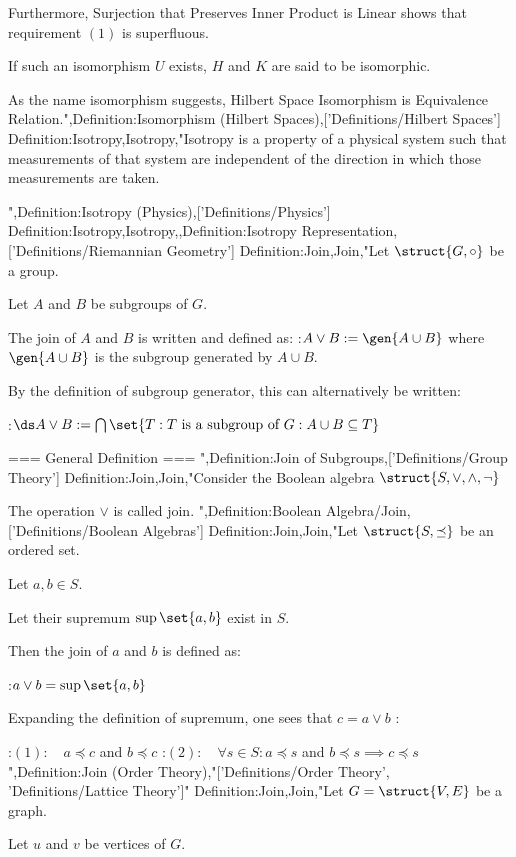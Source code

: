 Furthermore, Surjection that Preserves Inner Product is Linear shows that requirement $(1)$ is superfluous.


If such an isomorphism $U$ exists, $H$ and $K$ are said to be isomorphic.


As the name isomorphism suggests, Hilbert Space Isomorphism is Equivalence Relation.",Definition:Isomorphism (Hilbert Spaces),['Definitions/Hilbert Spaces']
Definition:Isotropy,Isotropy,"Isotropy is a property of a physical system such that measurements of that system are independent of the direction in which those measurements are taken.

",Definition:Isotropy (Physics),['Definitions/Physics']
Definition:Isotropy,Isotropy,,Definition:Isotropy Representation,['Definitions/Riemannian Geometry']
Definition:Join,Join,"Let $\struct {G, \circ}$ be a group.

Let $A$ and $B$ be subgroups of $G$.


The join of $A$ and $B$ is written and defined as:
:$A \vee B := \gen {A \cup B}$
where $\gen {A \cup B}$ is the subgroup generated by $A \cup B$.


By the definition of subgroup generator, this can alternatively be written:

:$\ds A \vee B := \bigcap \set {T: T \text { is a subgroup of } G: A \cup B \subseteq T}$


=== General Definition ===
",Definition:Join of Subgroups,['Definitions/Group Theory']
Definition:Join,Join,"Consider the Boolean algebra $\struct {S, \vee, \wedge, \neg}$


The operation $\vee$ is called join.
",Definition:Boolean Algebra/Join,['Definitions/Boolean Algebras']
Definition:Join,Join,"Let $\struct {S, \preceq}$ be an ordered set.

Let $a, b \in S$.

Let their supremum $\sup \set {a, b}$ exist in $S$.


Then the join of $a$ and $b$ is defined as:

:$a \vee b = \sup \set {a, b}$


Expanding the definition of supremum, one sees that $c = a \vee b$ :

:$(1): \quad a \preceq c$ and $b \preceq c$
:$(2): \quad \forall s \in S: a \preceq s$ and $b \preceq s \implies c \preceq s$",Definition:Join (Order Theory),"['Definitions/Order Theory', 'Definitions/Lattice Theory']"
Definition:Join,Join,"Let $G = \struct {V, E}$ be a graph.

Let $u$ and $v$ be vertices of $G$.

